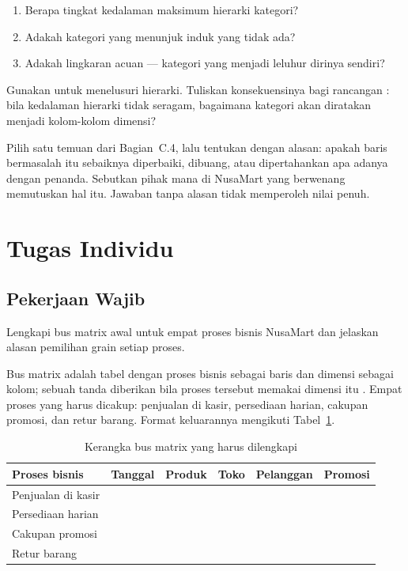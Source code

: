 \begin{enumerate}[leftmargin=1.4em]
  \item Berapa tingkat kedalaman maksimum hierarki kategori?
  \item Adakah kategori yang menunjuk induk yang tidak ada?
  \item Adakah lingkaran acuan --- kategori yang menjadi leluhur dirinya
        sendiri?
\end{enumerate}

Gunakan  untuk menelusuri hierarki. Tuliskan
konsekuensinya bagi rancangan : bila kedalaman hierarki
tidak seragam, bagaimana kategori akan diratakan menjadi kolom-kolom dimensi?


Pilih satu temuan dari Bagian~C.4, lalu tentukan dengan alasan: apakah baris
bermasalah itu sebaiknya diperbaiki, dibuang, atau dipertahankan apa adanya
dengan penanda. Sebutkan pihak mana di NusaMart yang berwenang memutuskan hal
itu. Jawaban tanpa alasan tidak memperoleh nilai penuh.

\section{Tugas Individu}

\subsection{Pekerjaan Wajib}
Lengkapi bus matrix awal untuk empat proses bisnis NusaMart dan jelaskan alasan
pemilihan grain setiap proses.

Bus matrix adalah tabel dengan proses bisnis sebagai baris dan dimensi sebagai
kolom; sebuah tanda diberikan bila proses tersebut memakai dimensi itu
\citep{kimball2013}. Empat proses yang harus dicakup: penjualan di kasir,
persediaan harian, cakupan promosi, dan retur barang. Format keluarannya
mengikuti Tabel~\ref{tab:m1-bus-matrix}.

\begin{table}[htbp]
\centering
\small
\caption{Kerangka bus matrix yang harus dilengkapi}
\label{tab:m1-bus-matrix}
\begin{tabular}{@{}p{}ccccc@{}}
\toprule
\textbf{Proses bisnis} & \textbf{Tanggal} & \textbf{Produk} & \textbf{Toko}
  & \textbf{Pelanggan} & \textbf{Promosi} \\
\midrule
Penjualan di kasir & & & & & \\
Persediaan harian  & & & & & \\
Cakupan promosi    & & & & & \\
Retur barang       & & & & & \\
\bottomrule
\end{tabular}
\end{table}

